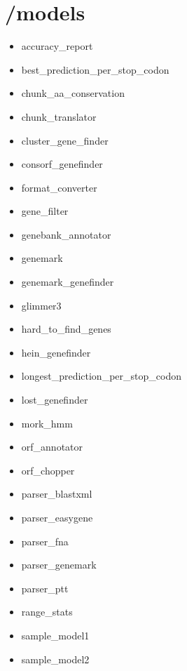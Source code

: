 \section{/models}
\begin{itemize}
\item accuracy\_report
\item best\_prediction\_per\_stop\_codon
\item chunk\_aa\_conservation
\item chunk\_translator
\item cluster\_gene\_finder
\item consorf\_genefinder
\item format\_converter
\item gene\_filter
\item genebank\_annotator
\item genemark
\item genemark\_genefinder
\item glimmer3
\item hard\_to\_find\_genes
\item hein\_genefinder
\item longest\_prediction\_per\_stop\_codon
\item lost\_genefinder
\item mork\_hmm
\item orf\_annotator
\item orf\_chopper
\item parser\_blastxml
\item parser\_easygene
\item parser\_fna
\item parser\_genemark
\item parser\_ptt
\item range\_stats
\item sample\_model1
\item sample\_model2
\end{itemize}




